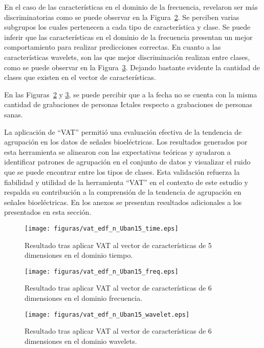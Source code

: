 En el caso de las características en el dominio de la frecuencia, revelaron ser más discriminatorias como se puede observar en la Figura~\ref{fig: Vat_freq}. Se perciben varias subgrupos los cuales pertenecen a cada tipo de característica y clase. Se puede inferir que las características en el dominio de la frecuencia presentan un mejor comportamiento para realizar predicciones correctas. En cuanto a las características wavelets, son las que mejor discriminación realizan entre clases, como se puede observar en la Figura~\ref{fig: Vat_wavelet}. Dejando bastante evidente la cantidad de clases que existen en el vector de características.

En las Figuras~\ref{fig: Vat_freq} y \ref{fig: Vat_wavelet}, se puede percibir que a la fecha no se cuenta con la misma cantidad de grabaciones de personas Ictales respecto a grabaciones de personas sanas. 

La aplicación de ``VAT'' permitió una evaluación efectiva de la tendencia de agrupación en los datos de señales bioeléctricas. Los resultados generados por esta herramienta se alinearon con las expectativas teóricas y ayudaron a identificar patrones de agrupación en el conjunto de datos y visualizar el ruido que se puede encontrar entre los tipos de clases. Esta validación refuerza la fiabilidad y utilidad de la herramienta ``VAT'' en el contexto de este estudio y respalda su contribución a la comprensión de la tendencia de agrupación en señales bioeléctricas.  En los anexos se presentan resultados adicionales a los presentados en esta sección.


\begin{figure}[H]
	\centering
	\texttt{[image: figuras/vat\_edf\_n\_Uban15\_time.eps]}
	\caption{Resultado tras aplicar VAT al vector de características de 5 dimensiones en el dominio tiempo.}
	\label{fig: Vat_time}
\end{figure}
\begin{figure}[H]
	\centering
	\texttt{[image: figuras/vat\_edf\_n\_Uban15\_freq.eps]}
	\caption{Resultado tras aplicar VAT al vector de características de 6 dimensiones en el dominio frecuencia.}
	\label{fig: Vat_freq}
\end{figure}
\begin{figure}[H]
	\centering
	\texttt{[image: figuras/vat\_edf\_n\_Uban15\_wavelet.eps]}
	\caption{Resultado tras aplicar VAT al vector de características de 6 dimensiones en el dominio wavelets.}
	\label{fig: Vat_wavelet}
\end{figure}



